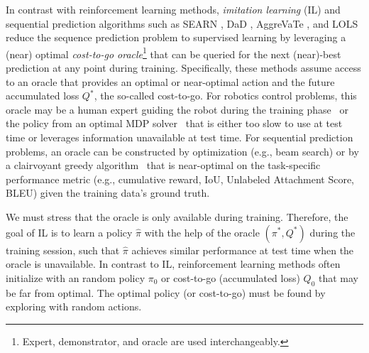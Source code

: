 \documentclass{article}
\begin{document}
In contrast with reinforcement learning methods,  \emph{imitation learning} (IL) and sequential prediction algorithms such as SEARN \cite{daume2009search}, DaD \cite{venkatraman2015improving}, AggreVaTe \cite{ross2014reinforcement}, and LOLS \cite{chang2015learning} reduce the sequence prediction problem to supervised learning by leveraging a (near) optimal \emph{cost-to-go oracle}\footnote{Expert, demonstrator, and oracle are used interchangeably.}  %
that can be queried for the next (near)-best prediction at any point %
during training. Specifically, these methods assume access to an oracle that provides an optimal or near-optimal action and the future accumulated loss $Q^*$, the so-called cost-to-go. For robotics control problems, this oracle may be a human expert guiding the robot during the training phase~ \cite{abbeel2004apprenticeship} or the policy from an optimal MDP solver~\cite{Ross2011_AISTATS,kahn2016plato} that is either too slow to use at test time or leverages information unavailable at test time. %
For sequential prediction problems, an oracle can be constructed by optimization (e.g., beam search) or by a clairvoyant greedy algorithm~\cite{daume2009search,ross2013contextual,rhinehart2015visual,chang2015learning_dependency} that is near-optimal on the task-specific performance metric (e.g., cumulative reward, IoU, Unlabeled Attachment Score, BLEU) given the training data's ground truth.

We must stress that the oracle is only available during training. Therefore, the goal of IL is to learn a policy $\hat \pi$ with the help of the oracle $(\pi^*, Q^*)$ during the training session, such that $\hat \pi$ achieves similar performance at test time when the oracle is unavailable. In contrast to IL, reinforcement learning methods often initialize with an random policy $\pi_0$ or cost-to-go (accumulated loss) $Q_0$ that may be far from optimal. The optimal policy (or cost-to-go) must be found by exploring with random actions.



\end{document}
